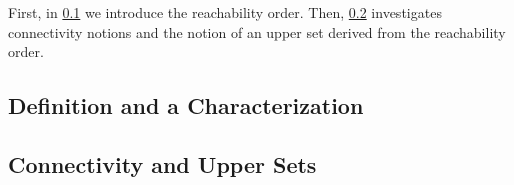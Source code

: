 First, in \cref{prelim:sec:reach:def} we introduce the reachability order.
Then, \cref{prelim:sec:reach:conn} investigates connectivity
notions and the notion of an upper set derived
from the reachability order.

\subsection{Definition and a Characterization}
\label{prelim:sec:reach:def}



\subsection{Connectivity and Upper Sets}
\label{prelim:sec:reach:conn} 

